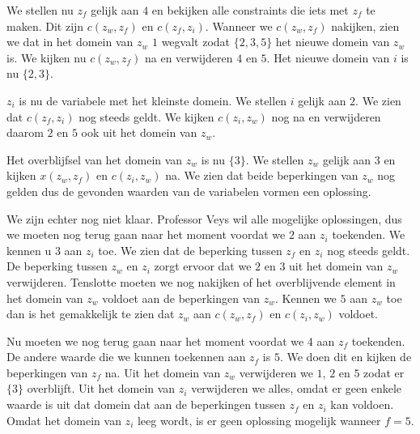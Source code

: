 \documentclass[alternative-exam.tex]{subfiles}
\begin{document}
We stellen nu $z_f$ gelijk aan $4$ en bekijken alle constraints die iets met $z_f$ te maken. Dit zijn $c(z_w,z_f)$ en $c(z_f,z_i)$. Wanneer we $c(z_w,z_f)$ nakijken, zien we dat in het domein van $z_w$ $1$ wegvalt zodat $\{2,3,5\}$ het nieuwe domein van $z_w$ is. We kijken nu $c(z_w,z_f)$ na en verwijderen $4$ en $5$. Het nieuwe domein van $i$ is nu $\{2,3\}$.

$z_i$ is nu de variabele met het kleinste domein. We stellen $i$ gelijk aan $2$. We zien dat $c(z_f,z_i)$ nog steeds geldt. We kijken $c(z_i,z_w)$ nog na en verwijderen daarom $2$ en $5$ ook uit het domein van $z_w$.

Het overblijfsel van het domein van $z_w$ is nu $\{3\}$. We stellen $z_w$ gelijk aan $3$ en kijken $x(z_w,z_f)$ en $c(z_i,z_w)$ na. We zien dat beide beperkingen van $z_w$ nog gelden dus de gevonden waarden van de variabelen vormen een oplossing.

We zijn echter nog niet klaar. Professor Veys wil alle mogelijke oplossingen, dus we moeten nog terug gaan naar het moment voordat we $2$ aan $z_i$ toekenden. We kennen u $3$ aan $z_i$ toe. We zien dat de beperking tussen $z_f$ en $z_i$ nog steeds geldt. De beperking tussen $z_w$ en $z_i$ zorgt ervoor dat we $2$ en $3$ uit het domein van $z_w$ verwijderen. Tenslotte moeten we nog nakijken of het overblijvende element in het domein van $z_w$ voldoet aan de beperkingen van $z_w$.
Kennen we $5$ aan $z_w$ toe dan is het gemakkelijk te zien dat $z_w$ aan $c(z_w,z_f)$ en $c(z_i,z_w)$ voldoet.

Nu moeten we nog terug gaan naar het moment voordat we $4$ aan $z_f$ toekenden. De andere waarde die we kunnen toekennen aan $z_f$ is $5$. We doen dit en kijken de beperkingen van $z_f$ na. Uit het domein van $z_w$ verwijderen we $1$, $2$ en $5$ zodat er $\{3\}$ overblijft. Uit het domein van $z_i$ verwijderen we alles, omdat er geen enkele waarde is uit dat domein dat aan de beperkingen tussen $z_f$ en $z_i$ kan voldoen. Omdat het domein van $z_i$ leeg wordt, is er geen oplossing mogelijk wanneer $f=5$.
\end{document}
